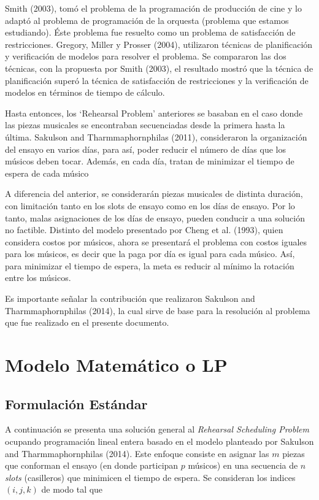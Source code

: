 \documentclass[journal, 10pt]{IEEEtran}
\begin{document}
Smith (2003)\cite{ref6}, tomó el problema de la programación de producción de cine y lo adaptó al problema de programación de la orquesta (problema que estamos estudiando). Éste problema fue resuelto como un problema de satisfacción de restricciones. Gregory, Miller y Prosser (2004)\cite{ref7}, utilizaron técnicas de planificación y verificación de modelos para resolver el problema. Se compararon las dos técnicas, con la propuesta por Smith (2003)\cite{ref6}, el resultado mostró que la técnica de planificación superó la técnica de satisfacción de restricciones y la verificación de modelos en términos de tiempo de cálculo.

Hasta entonces, los `Rehearsal Problem' anteriores se basaban en el caso donde las piezas musicales se encontraban secuenciadas desde la primera hasta la última. Sakulson and Tharmmaphornphilas (2011)\cite{ref8}, consideraron la organización del ensayo en varios días, para así, poder reducir el número de días que los músicos deben tocar. Además, en cada día, tratan de minimizar el tiempo de espera de cada músico

A diferencia del anterior, se considerarán piezas musicales de distinta duración, con limitación tanto en los slots de ensayo como en los días de ensayo. Por lo tanto, malas asignaciones de los días de ensayo, pueden conducir a una solución no factible. 
Distinto del modelo presentado por  Cheng et al. (1993)\cite{ref1}, quien considera costos por músicos, ahora se presentará el problema con costos iguales para los músicos, es decir que la paga por día es igual para cada músico. Así, para minimizar el tiempo de espera, la meta es reducir al mínimo la rotación entre los músicos.

Es importante señalar la contribución que realizaron Sakulson and Tharmmaphornphilas (2014)\cite{ref9}, la cual sirve de base para la resolución al problema que fue realizado en el presente documento.


\section{Modelo Matemático o LP}
\subsection{Formulación Estándar}
A continuación se presenta una solución general al \textit{Rehearsal Scheduling Problem} ocupando programación lineal entera basado en el modelo planteado por Sakulson and Tharmmaphornphilas (2014)\cite{ref9}. Este enfoque consiste en asignar las $m$ piezas que conforman el ensayo (en donde participan $p$ músicos) en una secuencia de $n$ \textit{slots} (casilleros) que minimicen el tiempo de espera. Se consideran los indices $(i,j,k)$ de modo tal que
\end{document}
